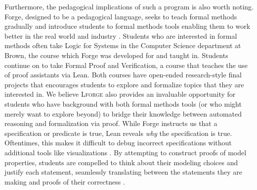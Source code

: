 Furthermore, the pedagogical implications of such a program is also worth noting. Forge, designed to be a pedagogical language, seeks to teach formal methods gradually and introduce students to formal methods tools enabling them to work better in the real world and industry \cite{ngpdbccdlrrvwwk-oopsla-2024}. Students who are interested in formal methods often take Logic for Systems in the Computer Science department at Brown, the course which Forge was developed for and taught in. Students continue on to take Formal Proof and Verification, a course that teaches the use of proof assistants via Lean. Both courses have open-ended research-style final projects that encourages students to explore and formalize topics that they are interested in. We believe \textsc{Lforge} also provides an invaluable opportunity for students who have background with both formal methods tools (or who might merely want to explore beyond) to bridge their knowledge between automated reasoning and formalization via proof. While Forge instructs us that a specification or predicate is true, Lean reveals \emph{why} the specification is true. Oftentimes, this makes it difficult to debug incorrect specifications without additional tools like visualizations \cite{ngpdbccdlrrvwwk-oopsla-2024}. By attempting to construct proofs of model properties, students are compelled to think about their modeling choices and justify each statement, seamlessly translating between the statements they are making and proofs of their correctness \cite{avigad2019learning}. 